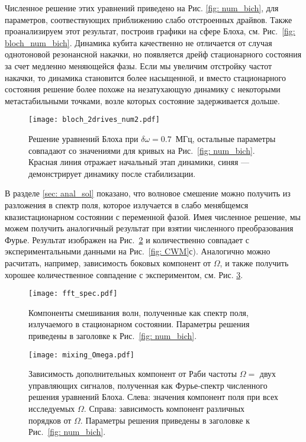 Численное решение этих уравнений приведено на Рис. \ref{fig: num_bich}, для параметров, соотвествующих приближению слабо отстроенных драйвов. Также проанализируем этот результат, построив графики на сфере Блоха, см. Рис.~\ref{fig: bloch_num_bich}. Динамика кубита качественно не отличается от случая однотоновой резонансной накачки, но появляется дрейф стационарного состояния за счет медленно меняющейся фазы. Если мы увеличим отстройку частот накачки, то динамика становится более насыщенной, и вместо стационарного состояния решение более похоже на незатухающую динамику с некоторыми метастабильными точками, возле которых состояние задерживается дольше. 
\begin{figure}[t]\label{fig: bloch_num_bich2}
	\centering
	\texttt{[image: bloch\_2drives\_num2.pdf]}
	\caption[Численное решение уравнений Блоха для случая бихроматической накачки на сфере Блоха, для случая $\delta\omega \approx \Gamma_1$]{Решение уравнений Блоха при $\delta\omega=0.7$~МГц, остальные параметры совпадают со значениями для кривых на Рис.~\ref{fig: num_bich}. Красная линия отражает начальный этап динамики, синяя --- демонстрирует динамику после стабилизации.}
\end{figure}
В разделе \ref{sec: anal_sol} показано, что волновое смешение можно получить из разложения в спектр поля, которое излучается в слабо менябщемся  квазистационарном состоянии с переменной фазой. Имея численное решение, мы можем получить аналогичный результат при взятии численного преобразования Фурье. Результат изображен на Рис.~\ref{fig: mix_fft} и количественно совпадает с экспериментальными данными на Рис.~\ref{fig: CWM}с). Аналогично можно расчитать, например, зависимость боковых компонент от $\Omega$, и также получить хорошее количественное  совпадение с экспериментом, см. Рис. \ref{fig: mix_fft_omega}.
\begin{figure}[t]\label{fig: mix_fft}
	\centering
	\texttt{[image: fft\_spec.pdf]}
	\caption[Компоненты смешивания волн, полученные как спектр поля, излучаемого в стационарном состоянии]{Компоненты смешивания волн, полученные как спектр поля, излучаемого в стационарном состоянии. Параметры решения приведены в заголовке к Рис.~\ref{fig: num_bich}.}
\end{figure}
\begin{figure}[t]\label{fig: mix_fft_omega}
	\centering
	\texttt{[image: mixing\_Omega.pdf]}
	\caption[Зависимость дополнительных компонент от Раби частоты двух управляющих сигналов]{Зависимость дополнительных компонент от Раби частоты $\Omega = $ двух управляющих сигналов, полученная как Фурье-спектр численного решения уравнений Блоха. Слева: значения компонент поля при всех исследуемых $\Omega$. Справа: зависимость компонент различных порядков от $\Omega$.  Параметры решения приведены в заголовке к Рис.~\ref{fig: num_bich}.}
\end{figure}


